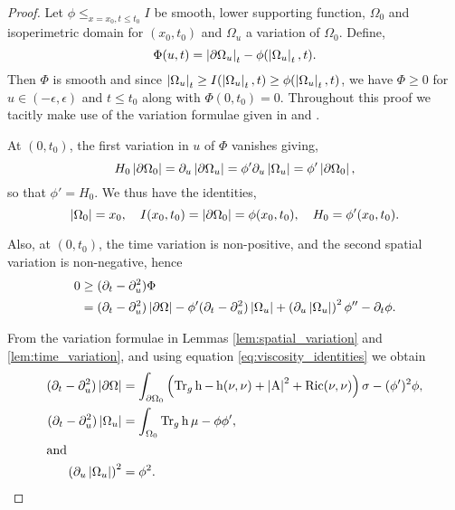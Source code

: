 \documentclass{amsart}
\begin{document}
\begin{proof}
Let \(\phi \leq_{x=x_0, t\leq t_0} I\) be smooth, lower supporting function, \(\Omega_0\) and isoperimetric domain for \((x_0, t_0)\) and \(\Omega_u\) a variation of \(\Omega_0\). Define,
\[
\Phi(u, t) = \left|{\partial {\Omega_u}}\right|_t - \phi(\left|{\Omega_u}\right|_t, t).
\]
Then \(\Phi\) is smooth and since \(\left|{\Omega_u}\right|_t \geq I(\left|{\Omega_u}\right|_t, t) \geq \phi(\left|{\Omega_u}\right|_t, t)\), we have \(\Phi \geq 0\) for \(u \in (-\epsilon, \epsilon)\) and \(t \leq t_0\) along with \(\Phi(0, t_0) = 0\). Throughout this proof we tacitly make use of the variation formulae given in  and .

At \((0, t_0)\), the first variation in \(u\) of \(\Phi\) vanishes giving,
\[
H_0 \left|{\partial {\Omega_0}}\right| = \partial_u \left|{\partial {\Omega_u}}\right| = \phi' \partial_u \left|{\Omega_u}\right| = \phi' \left|{\partial {\Omega_0}}\right|,
\]
so that \(\phi' = H_0\). We thus have the identities,
\begin{equation}
\label{eq:viscosity_identities}
\left|{\Omega_0}\right| = x_0, \quad I(x_0, t_0) = \left|{\partial {\Omega_0}}\right| = \phi(x_0, t_0), \quad H_0 = \phi'(x_0, t_0).
\end{equation}

Also, at \((0, t_0)\), the time variation is non-positive, and the second spatial variation is non-negative, hence
\[
\begin{split}
0 &\geq (\partial_t - \partial_u^2) \Phi \\
&= (\partial_t - \partial_u^2) \left|{\partial {\Omega}}\right| - \phi'(\partial_t - \partial_u^2) \left|{\Omega_u}\right| + \left(\partial_u \left|{\Omega_u}\right|\right)^2 \phi'' - \partial_t \phi.
\end{split}
\]

From the variation formulae in Lemmas \ref{lem:spatial_variation} and \ref{lem:time_variation}, and using equation \eqref{eq:viscosity_identities} we obtain
\begin{align*}
(\partial_t - \partial_u^2) \left|{\partial {\Omega}}\right| &= \int_{\partial {\Omega_0}} \left(\operatorname{Tr}_g \operatorname{h} - \operatorname{h}(\nu, \nu) + \left|{\operatorname{A}}\right|^2 + \operatorname{Ric}(\nu, \nu)\right) \sigma - (\phi')^2 \phi, \\
(\partial_t - \partial_u^2) \left|{\Omega_u}\right| &= \int_{\Omega_0} \operatorname{Tr}_g \operatorname{h} \mu - \phi \phi', \\
\intertext{and}
\left(\partial_u \left|{\Omega_u}\right|\right)^2 &= \phi^2.
\end{align*}


\end{proof}
\end{document}

